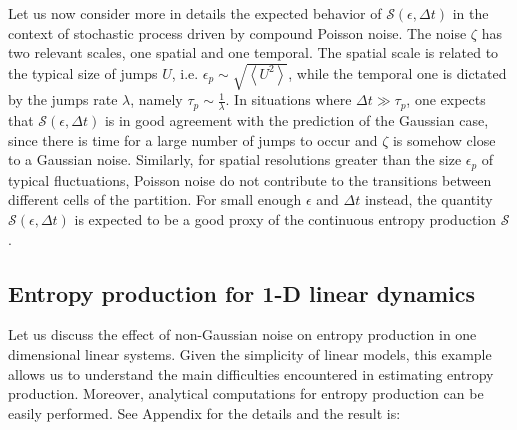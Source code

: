 \documentclass[12pt]{iopart}
\newcommand{\lx} {\left}
\newcommand{\rx} {\right}
\newcommand{\ave}[1] {\lx\langle #1 \rx\rangle}
\newcommand{\cS} {\mathcal{S}}
\begin{document}
Let us now consider more in details the expected behavior of $\cS(\epsilon,\Delta t)$ in the context of stochastic process driven by compound Poisson noise. The noise $\zeta$ has two relevant scales, one spatial and one temporal. The spatial scale is related to the typical size of jumps $U$, i.e. $\epsilon_{p}\sim\sqrt{\ave{U^2}}$, while the temporal one is dictated by the jumps rate $\lambda$, namely $\tau_p\sim\frac{1}{\lambda}$. In situations where $\Delta t \gg \tau_p$, one expects that $\cS(\epsilon,\Delta t)$ is in good agreement with the prediction of the Gaussian case, since there is time for a large number of jumps to occur and $\zeta$ is somehow close to a Gaussian noise. Similarly, for spatial resolutions greater than the size $\epsilon_p$ of typical fluctuations, Poisson noise do not contribute to the transitions between different cells of the partition. For small enough $\epsilon$ and $\Delta t$ instead, the quantity $\cS(\epsilon,\Delta t)$ is expected to be a good proxy of the continuous entropy production $\cS$. 


\subsection{Entropy production for 1-D linear dynamics}
Let us discuss the effect of non-Gaussian noise on entropy production in one dimensional linear systems. Given the simplicity of linear models, this example allows us to understand the main difficulties encountered in estimating entropy production. 
Moreover, analytical computations for entropy production can be easily performed. See Appendix for the details and the result is:
\end{document}
